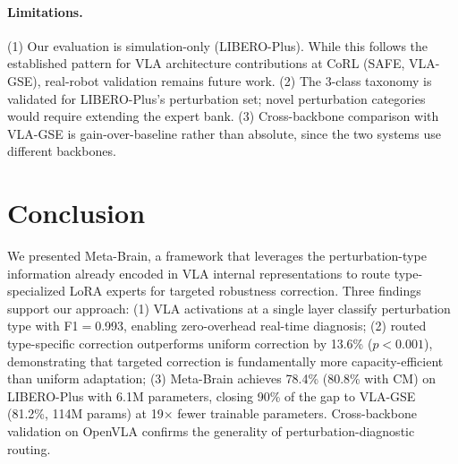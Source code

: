 \documentclass[conference]{article}
\newcommand{\ours}{Meta-Brain}
\newcommand{\liberoplus}{LIBERO-Plus}
\begin{document}
\paragraph{Limitations.}
(1) Our evaluation is simulation-only (\liberoplus{}). While this follows the established pattern for VLA architecture contributions at CoRL (SAFE, VLA-GSE), real-robot validation remains future work.
(2) The 3-class taxonomy is validated for \liberoplus{}'s perturbation set; novel perturbation categories would require extending the expert bank.
(3) Cross-backbone comparison with VLA-GSE is gain-over-baseline rather than absolute, since the two systems use different backbones.

\section{Conclusion}

We presented \ours{}, a framework that leverages the perturbation-type information already encoded in VLA internal representations to route type-specialized LoRA experts for targeted robustness correction.
Three findings support our approach:
(1) VLA activations at a single layer classify perturbation type with F1$=$0.993, enabling zero-overhead real-time diagnosis;
(2) routed type-specific correction outperforms uniform correction by 13.6\% ($p<0.001$), demonstrating that targeted correction is fundamentally more capacity-efficient than uniform adaptation;
(3) \ours{} achieves 78.4\% (80.8\% with CM) on \liberoplus{} with 6.1M parameters, closing 90\% of the gap to VLA-GSE (81.2\%, 114M params) at 19$\times$ fewer trainable parameters.
Cross-backbone validation on OpenVLA confirms the generality of perturbation-diagnostic routing.
\end{document}
